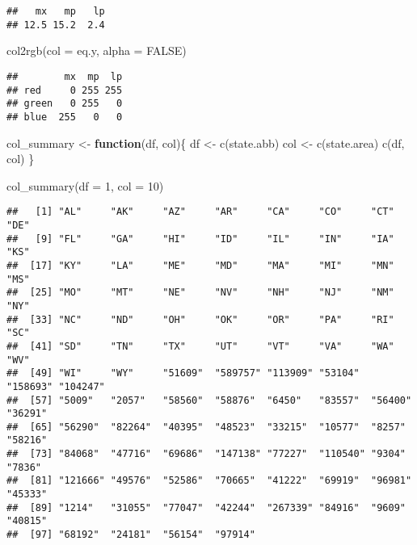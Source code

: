 \documentclass[
]{article}
\newenvironment{Shaded}{\begin{snugshade}}{\end{snugshade}}
\newcommand{\AttributeTok}[1]{\textcolor[rgb]{0.77,0.63,0.00}{#1}}
\newcommand{\ConstantTok}[1]{\textcolor[rgb]{0.00,0.00,0.00}{#1}}
\newcommand{\ControlFlowTok}[1]{\textcolor[rgb]{0.13,0.29,0.53}{\textbf{#1}}}
\newcommand{\DecValTok}[1]{\textcolor[rgb]{0.00,0.00,0.81}{#1}}
\newcommand{\FunctionTok}[1]{\textcolor[rgb]{0.00,0.00,0.00}{#1}}
\newcommand{\NormalTok}[1]{#1}
\newcommand{\OtherTok}[1]{\textcolor[rgb]{0.56,0.35,0.01}{#1}}
\begin{document}
\begin{verbatim}
##   mx   mp   lp 
## 12.5 15.2  2.4
\end{verbatim}

\begin{Shaded}
\begin{Highlighting}[]
\FunctionTok{col2rgb}\NormalTok{(}\AttributeTok{col =}\NormalTok{ eq.y, }\AttributeTok{alpha =} \ConstantTok{FALSE}\NormalTok{)}
\end{Highlighting}
\end{Shaded}

\begin{verbatim}
##        mx  mp  lp
## red     0 255 255
## green   0 255   0
## blue  255   0   0
\end{verbatim}

\begin{Shaded}
\begin{Highlighting}[]
\NormalTok{col\_summary }\OtherTok{\textless{}{-}} \ControlFlowTok{function}\NormalTok{(df, col)\{}
\NormalTok{  df }\OtherTok{\textless{}{-}} \FunctionTok{c}\NormalTok{(state.abb)}
\NormalTok{  col }\OtherTok{\textless{}{-}} \FunctionTok{c}\NormalTok{(state.area)}
  \FunctionTok{c}\NormalTok{(df, col)}
\NormalTok{\}}

\FunctionTok{col\_summary}\NormalTok{(}\AttributeTok{df =} \DecValTok{1}\NormalTok{, }\AttributeTok{col =} \DecValTok{10}\NormalTok{)}
\end{Highlighting}
\end{Shaded}

\begin{verbatim}
##   [1] "AL"     "AK"     "AZ"     "AR"     "CA"     "CO"     "CT"     "DE"    
##   [9] "FL"     "GA"     "HI"     "ID"     "IL"     "IN"     "IA"     "KS"    
##  [17] "KY"     "LA"     "ME"     "MD"     "MA"     "MI"     "MN"     "MS"    
##  [25] "MO"     "MT"     "NE"     "NV"     "NH"     "NJ"     "NM"     "NY"    
##  [33] "NC"     "ND"     "OH"     "OK"     "OR"     "PA"     "RI"     "SC"    
##  [41] "SD"     "TN"     "TX"     "UT"     "VT"     "VA"     "WA"     "WV"    
##  [49] "WI"     "WY"     "51609"  "589757" "113909" "53104"  "158693" "104247"
##  [57] "5009"   "2057"   "58560"  "58876"  "6450"   "83557"  "56400"  "36291" 
##  [65] "56290"  "82264"  "40395"  "48523"  "33215"  "10577"  "8257"   "58216" 
##  [73] "84068"  "47716"  "69686"  "147138" "77227"  "110540" "9304"   "7836"  
##  [81] "121666" "49576"  "52586"  "70665"  "41222"  "69919"  "96981"  "45333" 
##  [89] "1214"   "31055"  "77047"  "42244"  "267339" "84916"  "9609"   "40815" 
##  [97] "68192"  "24181"  "56154"  "97914"
\end{verbatim}
\end{document}
